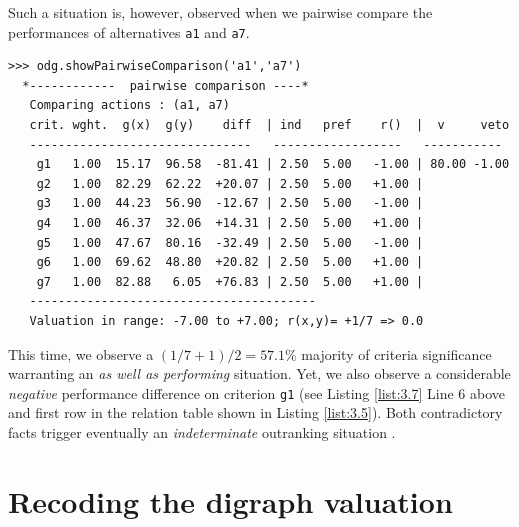 Such a situation is, however, observed when we pairwise compare the performances of alternatives \texttt{a1} and \texttt{a7}.
\begin{lstlisting}[caption={Pairwiese comparison with considerable performance difference},label=list:3.7,basicstyle=\scriptsize]
>>> odg.showPairwiseComparison('a1','a7')
  *------------  pairwise comparison ----*
   Comparing actions : (a1, a7)
   crit. wght.  g(x)  g(y)    diff  | ind   pref    r()  |  v     veto
   -------------------------------   ------------------   -----------
    g1   1.00  15.17  96.58  -81.41 | 2.50  5.00   -1.00 | 80.00 -1.00
    g2   1.00  82.29  62.22  +20.07 | 2.50  5.00   +1.00 | 
    g3   1.00  44.23  56.90  -12.67 | 2.50  5.00   -1.00 | 
    g4   1.00  46.37  32.06  +14.31 | 2.50  5.00   +1.00 | 
    g5   1.00  47.67  80.16  -32.49 | 2.50  5.00   -1.00 | 
    g6   1.00  69.62  48.80  +20.82 | 2.50  5.00   +1.00 | 
    g7   1.00  82.88   6.05  +76.83 | 2.50  5.00   +1.00 | 
   ----------------------------------------
   Valuation in range: -7.00 to +7.00; r(x,y)= +1/7 => 0.0
\end{lstlisting}
This time, we observe a $(1/7 + 1)/2 = 57.1\%$ majority of criteria significance warranting an \emph{as well as performing} situation. Yet, we also observe a considerable \emph{negative} performance difference on criterion \texttt{g1} (see Listing \ref{list:3.7} Line 6 above and first row in the relation table shown in Listing \ref{list:3.5}). Both contradictory facts trigger eventually an \emph{indeterminate} outranking situation \citep{BIS-2013}. 

\section{Recoding the digraph valuation}
\label{sec:3.4}

